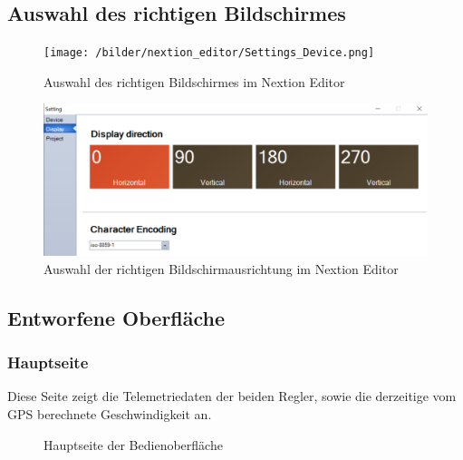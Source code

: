 \newpage
\subsection{Auswahl des richtigen Bildschirmes}
\begin{figure}[h]
    \centering
    \texttt{[image: /bilder/nextion\_editor/Settings\_Device.png]}
    \caption{Auswahl des richtigen Bildschirmes im Nextion Editor}
\end{figure}

\begin{figure}[h]
    \centering
    \includegraphics[width=\textwidth]{bilder/nextion_editor/Settings_Display.png}
    \caption{Auswahl der richtigen Bildschirmausrichtung im Nextion Editor}
\end{figure}

\newpage
\subsection{Entworfene Oberfläche}
\subsubsection{Hauptseite}
Diese Seite zeigt die Telemetriedaten der beiden Regler, sowie die derzeitige vom GPS berechnete Geschwindigkeit an.
\begin{figure}[h]
    \centering
    \caption{Hauptseite der Bedienoberfläche}
\end{figure}
\newpage

